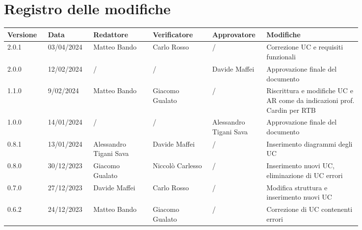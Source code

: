 \section*{Registro delle modifiche}


 {
  \renewcommand{\arraystretch}{1.5}
  \scriptsize
  \begin{longtable}{p{0.10\linewidth}p{0.10\linewidth}p{0.15\linewidth}p{0.15\linewidth}p{0.10\linewidth}p{0.24\linewidth}}
	  \textbf{Versione} & \textbf{Data} & \textbf{Redattore}     & \textbf{Verificatore}  & \textbf{Approvatore}   & \textbf{Modifiche}                                                       \\
	  \hline
	  2.0.1             & 03/04/2024    & Matteo Bando           & Carlo Rosso & /           			   & Correzione UC e requisiti funzionali                                        \\ 
	  \hline
	  2.0.0             & 12/02/2024    & /                      & /                      & Davide Maffei          & Approvazione finale del documento                                        \\
	  \hline
	  1.1.0             & 9/02/2024     & Matteo Bando           & Giacomo Gualato        & /                      & Riscrittura e modifiche UC e AR come da indicazioni prof. Cardin per RTB \\
	  \hline
	  1.0.0             & 14/01/2024    & /                      & /                      & Alessandro Tigani Sava & Approvazione finale del documento                                        \\
	  \hline
	  0.8.1             & 13/01/2024    & Alessandro Tigani Sava & Davide Maffei          & /                      & Inserimento diagrammi degli UC                                           \\
	  \hline
	  0.8.0             & 30/12/2023    & Giacomo Gualato        & Niccolò Carlesso       & /                      & Inserimento nuovi UC, eliminazione di UC errori                          \\
	  \hline
	  0.7.0             & 27/12/2023    & Davide Maffei          & Carlo Rosso            & /                      & Modifica struttura e inserimento nuovi UC                                \\
	  \hline
	  0.6.2             & 24/12/2023    & Matteo Bando           & Giacomo Gualato        & /                      & Correzione di UC contenenti errori                                       \\
	  \hline

\end{longtable}}
